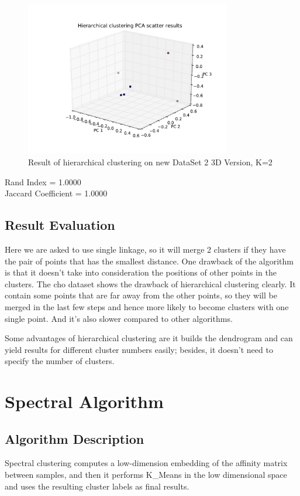 \documentclass[paper=letter, fontsize=11pt]{article}
\numberwithin{equation}{section}		%
\numberwithin{figure}{section}			%
\numberwithin{table}{section}				%
\begin{document}
\begin{figure}[H]
	\centering
	\includegraphics[width=0.8\textwidth]{H_new_dataset_2_3D.pdf}
	\caption{Result of hierarchical clustering on new DataSet 2 3D Version, K=2}
\end{figure}
\noindent Rand Index = 1.0000\\
Jaccard Coefficient = 1.0000\\

\subsection{Result Evaluation}
Here we are asked to use single linkage, so it will merge 2 clusters if they have the pair of points that has the smallest distance. One drawback of the algorithm is that it doesn't take into consideration the positions of other points in the clusters. The cho dataset shows the drawback of  hierarchical clustering clearly. It contain some points that are far away from the other points, so they will be merged in the last few steps and hence more likely to become clusters with one single point.  And it's also slower compared to other algorithms.

Some advantages of hierarchical clustering are it builds the dendrogram and can yield results for different cluster numbers easily; besides, it doesn't need to specify the number of clusters.

\section{Spectral Algorithm}
\subsection{Algorithm Description}
Spectral clustering computes a low-dimension embedding of the affinity matrix between samples, and then it performs K\_Means in the low dimensional space and uses the resulting cluster labels as final results.
\end{document}

